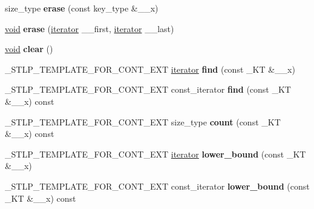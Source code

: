 \begin{DoxyCompactItemize}
\item 
\mbox{\label{classmap_a2656345c7f48a234f6e1ca9728023ce6}} 
size\+\_\+type {\bfseries erase} (const key\+\_\+type \&\+\_\+\+\_\+x)
\item 
\mbox{\label{classmap_a2d517a81eff8575237bb0fd43dae0fb9}} 
\hyperlink{interfacevoid}{void} {\bfseries erase} (\hyperlink{structiterator}{iterator} \+\_\+\+\_\+first, \hyperlink{structiterator}{iterator} \+\_\+\+\_\+last)
\item 
\mbox{\label{classmap_a62a641c9e05ab4e79b13c0d658245ea5}} 
\hyperlink{interfacevoid}{void} {\bfseries clear} ()
\item 
\mbox{\label{classmap_a123fa8972120040acab3ebe8c868a52f}} 
\+\_\+\+S\+T\+L\+P\+\_\+\+T\+E\+M\+P\+L\+A\+T\+E\+\_\+\+F\+O\+R\+\_\+\+C\+O\+N\+T\+\_\+\+E\+XT \hyperlink{structiterator}{iterator} {\bfseries find} (const \+\_\+\+KT \&\+\_\+\+\_\+x)
\item 
\mbox{\label{classmap_acf031dc1c37fda1542e5a6d9d1011966}} 
\+\_\+\+S\+T\+L\+P\+\_\+\+T\+E\+M\+P\+L\+A\+T\+E\+\_\+\+F\+O\+R\+\_\+\+C\+O\+N\+T\+\_\+\+E\+XT const\+\_\+iterator {\bfseries find} (const \+\_\+\+KT \&\+\_\+\+\_\+x) const
\item 
\mbox{\label{classmap_a86dac0970a8cc03bc64007473cb9d896}} 
\+\_\+\+S\+T\+L\+P\+\_\+\+T\+E\+M\+P\+L\+A\+T\+E\+\_\+\+F\+O\+R\+\_\+\+C\+O\+N\+T\+\_\+\+E\+XT size\+\_\+type {\bfseries count} (const \+\_\+\+KT \&\+\_\+\+\_\+x) const
\item 
\mbox{\label{classmap_a52fdd55a674dbb44e031681e1056415d}} 
\+\_\+\+S\+T\+L\+P\+\_\+\+T\+E\+M\+P\+L\+A\+T\+E\+\_\+\+F\+O\+R\+\_\+\+C\+O\+N\+T\+\_\+\+E\+XT \hyperlink{structiterator}{iterator} {\bfseries lower\+\_\+bound} (const \+\_\+\+KT \&\+\_\+\+\_\+x)
\item 
\mbox{\label{classmap_a0cfaf4da4c588471d6ecf4c3837fac49}} 
\+\_\+\+S\+T\+L\+P\+\_\+\+T\+E\+M\+P\+L\+A\+T\+E\+\_\+\+F\+O\+R\+\_\+\+C\+O\+N\+T\+\_\+\+E\+XT const\+\_\+iterator {\bfseries lower\+\_\+bound} (const \+\_\+\+KT \&\+\_\+\+\_\+x) const
\item 
\mbox{\label{classmap_ab3d6a4ecd8049d71998de27ef9363cde}} 

\end{DoxyCompactItemize}
